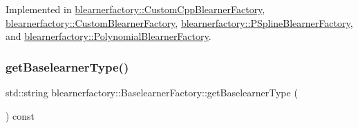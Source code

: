 Implemented in \mbox{\hyperlink{classblearnerfactory_1_1_custom_cpp_blearner_factory_ac98fae043e6822605261c7c6f7125e8c}{blearnerfactory\+::\+Custom\+Cpp\+Blearner\+Factory}}, \mbox{\hyperlink{classblearnerfactory_1_1_custom_blearner_factory_aad915d1ac58a323d1584d27f8cdace56}{blearnerfactory\+::\+Custom\+Blearner\+Factory}}, \mbox{\hyperlink{classblearnerfactory_1_1_p_spline_blearner_factory_a877072332da418456dcbcb27c572c1e7}{blearnerfactory\+::\+P\+Spline\+Blearner\+Factory}}, and \mbox{\hyperlink{classblearnerfactory_1_1_polynomial_blearner_factory_ac0c7f742da0a2de444e91a0cfb0a9384}{blearnerfactory\+::\+Polynomial\+Blearner\+Factory}}.

\mbox{\label{classblearnerfactory_1_1_baselearner_factory_a05d5c00f7a434548868c4ad21d0f5fda}} 
\subsubsection{\texorpdfstring{get\+Baselearner\+Type()}{getBaselearnerType()}}
{\footnotesize\ttfamily std\+::string blearnerfactory\+::\+Baselearner\+Factory\+::get\+Baselearner\+Type (\begin{DoxyParamCaption}{ }\end{DoxyParamCaption}) const}

